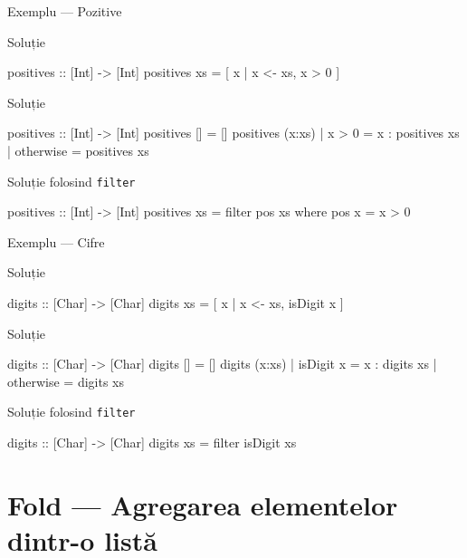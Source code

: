 \documentclass[handout,xcolor=pdftex,romanian,colorlinks]{beamer}
\begin{document}
\begin{frame}[fragile]{Exemplu --- Pozitive}
\begin{block}{Soluție }
\vspace{-1ex}
\begin{asciihs}
positives :: [Int] -> [Int]
positives xs = [ x | x <- xs, x > 0 ]
\end{asciihs}
\end{block}
\begin{block}{Soluție }
\vspace{-1ex}
\begin{asciihs}
positives :: [Int] -> [Int]
positives []                 = []
positives (x:xs) | x > 0     = x : positives xs
                 | otherwise = positives xs
\end{asciihs}
\end{block}
\begin{block}{Soluție folosind \lstinline$filter$}
\vspace{-1ex}
\begin{asciihs}
positives :: [Int] -> [Int]
positives xs = filter pos xs
  where pos x = x > 0
\end{asciihs}
\end{block}
\end{frame}


\begin{frame}[fragile]{Exemplu --- Cifre}
\begin{block}{Soluție }
\begin{asciihs}
digits :: [Char] -> [Char]
digits xs = [ x | x <- xs, isDigit x ]
\end{asciihs}
\end{block}
\begin{block}{Soluție }
\begin{asciihs}
digits :: [Char] -> [Char]
digits []                 = []
digits (x:xs) | isDigit x = x : digits xs
              | otherwise = digits xs
\end{asciihs}
\end{block}
\begin{block}{Soluție folosind \lstinline$filter$}
\begin{asciihs}
digits :: [Char] -> [Char]
digits xs = filter isDigit xs
\end{asciihs}
\end{block}
\end{frame}

\section{Fold --- Agregarea elementelor dintr-o listă}
\end{document}
